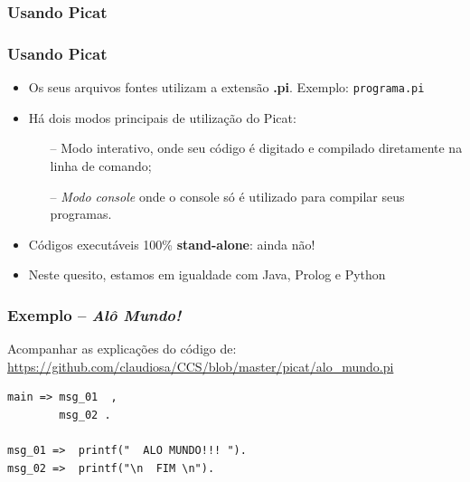 \subsubsection{Usando Picat}

\begin{frame}[fragile]
  \frametitle{Usando Picat}
  	\begin{itemize}
    
      
      
   
      \item Os seus arquivos fontes utilizam a extensão \textbf{.pi}. Exemplo: \texttt{programa.pi}
      \item Há dois modos principais de utilização do Picat: 
      
      \begin{itemize}
      	\item[--] Modo interativo, onde seu código é digitado e compilado diretamente na linha de 
        comando;
      	\item[--] \textit{Modo console} onde o console só é utilizado para compilar seus programas.
      \end{itemize}
      
      \pause
      \item Códigos executáveis 100\% \textbf{stand-alone}: ainda não!
      \item Neste quesito, estamos em igualdade com Java, Prolog e Python
     
    \end{itemize}
\end{frame}





\begin{frame}[fragile]
\frametitle{Exemplo -- \textit{Alô Mundo!}}

Acompanhar as explicações do código de:\\
\url{https://github.com/claudiosa/CCS/blob/master/picat/alo_mundo.pi}

\begin{verbatim}
main => msg_01  , 
        msg_02 .
        
msg_01 =>  printf("  ALO MUNDO!!! ").
msg_02 =>  printf("\n  FIM \n").
\end{verbatim}

\end{frame}


